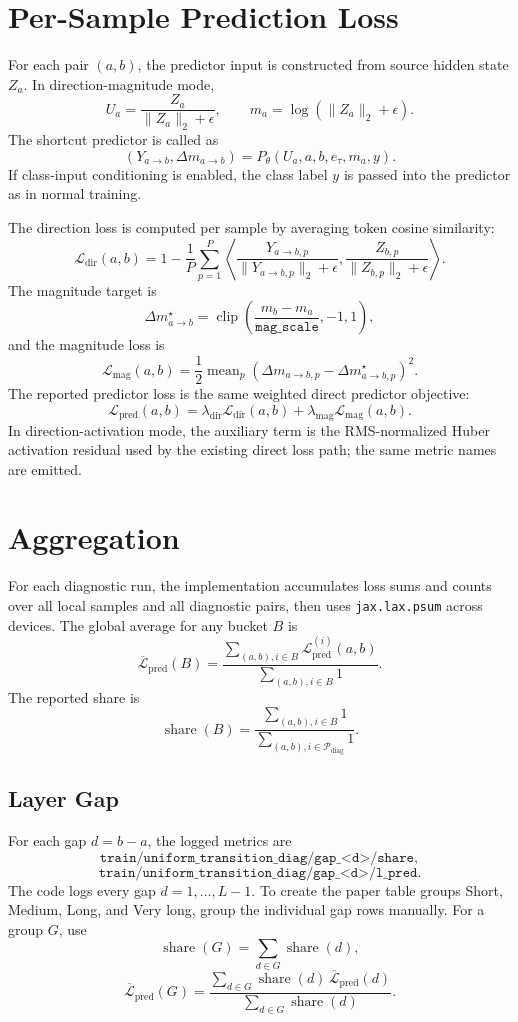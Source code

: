 \documentclass[11pt]{article}
\begin{document}
\section{Per-Sample Prediction Loss}
For each pair \((a,b)\), the predictor input is constructed from source hidden
state \(Z_a\). In direction-magnitude mode,
\[
U_a=\frac{Z_a}{\|Z_a\|_2+\epsilon},\qquad
m_a=\log(\|Z_a\|_2+\epsilon).
\]
The shortcut predictor is called as
\[
(Y_{a\rightarrow b},\Delta m_{a\rightarrow b})
=P_\theta(U_a,a,b,e_\tau,m_a,y).
\]
If class-input conditioning is enabled, the class label \(y\) is passed into
the predictor as in normal training.

The direction loss is computed per sample by averaging token cosine similarity:
\[
\mathcal{L}_{\mathrm{dir}}(a,b)
=1-\frac{1}{P}\sum_{p=1}^{P}
\left\langle
\frac{Y_{a\rightarrow b,p}}{\|Y_{a\rightarrow b,p}\|_2+\epsilon},
\frac{Z_{b,p}}{\|Z_{b,p}\|_2+\epsilon}
\right\rangle.
\]
The magnitude target is
\[
\Delta m^\star_{a\rightarrow b}
=\operatorname{clip}\left(\frac{m_b-m_a}{\texttt{mag\_scale}},-1,1\right),
\]
and the magnitude loss is
\[
\mathcal{L}_{\mathrm{mag}}(a,b)
=\frac{1}{2}\operatorname{mean}_{p}
\left(\Delta m_{a\rightarrow b,p}-\Delta m^\star_{a\rightarrow b,p}\right)^2.
\]
The reported predictor loss is the same weighted direct predictor objective:
\[
\mathcal{L}_{\mathrm{pred}}(a,b)
=\lambda_{\mathrm{dir}}\mathcal{L}_{\mathrm{dir}}(a,b)
+\lambda_{\mathrm{mag}}\mathcal{L}_{\mathrm{mag}}(a,b).
\]
In direction-activation mode, the auxiliary term is the RMS-normalized Huber
activation residual used by the existing direct loss path; the same metric
names are emitted.

\section{Aggregation}
For each diagnostic run, the implementation accumulates loss sums and counts
over all local samples and all diagnostic pairs, then uses \texttt{jax.lax.psum}
across devices. The global average for any bucket \(B\) is
\[
\overline{\mathcal{L}}_{\mathrm{pred}}(B)
=
\frac{\sum_{(a,b),i\in B}\mathcal{L}_{\mathrm{pred}}^{(i)}(a,b)}
{\sum_{(a,b),i\in B}1}.
\]
The reported share is
\[
\operatorname{share}(B)
=
\frac{\sum_{(a,b),i\in B}1}
{\sum_{(a,b),i\in \mathcal{P}_{\mathrm{diag}}}1}.
\]

\subsection{Layer Gap}
For each gap \(d=b-a\), the logged metrics are
\[
\texttt{train/uniform\_transition\_diag/gap\_<d>/share},
\]
\[
\texttt{train/uniform\_transition\_diag/gap\_<d>/l\_pred}.
\]
The code logs every gap \(d=1,\ldots,L-1\). To create the paper table groups
Short, Medium, Long, and Very long, group the individual gap rows manually.
For a group \(G\), use
\[
\operatorname{share}(G)=\sum_{d\in G}\operatorname{share}(d),
\]
\[
\overline{\mathcal{L}}_{\mathrm{pred}}(G)
=
\frac{\sum_{d\in G}\operatorname{share}(d)\,
\overline{\mathcal{L}}_{\mathrm{pred}}(d)}
{\sum_{d\in G}\operatorname{share}(d)}.
\]
\end{document}
